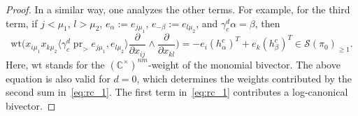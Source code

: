 \documentclass[11pt]{article}
\DeclareMathOperator{\pr}{pr}
\theoremstyle{definition}\newtheorem{definition}[theorem]{Definition}
\theoremstyle{definition}\newtheorem{remark}[theorem]{Remark}
\theoremstyle{remark}
\numberwithin{equation}{section}
\begin{document}
\begin{proof}
    In a similar way, one analyzes the other terms. For example, for the third term, if $j <\mu_1$, $l > \mu_2$, $e_{\alpha}:=e_{j\mu_1}$, $e_{-\beta}:= e_{l\mu_2}$, and $\gamma_c^d\alpha = \beta$, then
    \begin{equation}\label{eq:rc_3}
        \mathrm{wt}\Big(x_{i\mu_1}x_{k\mu_2}\langle \gamma_c^d\pr_>e_{j\mu_1},e_{l\mu_2}\rangle \frac{\partial}{\partial x_{ij}}\wedge \frac{\partial}{\partial x_{kl}}\Big) =  -e_i(h_{\alpha}^c)^T + e_k(h_{\beta}^c)^T \in \mathcal{S}(\pi_0)_{\geq 1}.
    \end{equation}
    Here, $\mathrm{wt}$ stands for the $(\mathbb{C}^{\times})^{nm}$-weight of the monomial bivector. The above equation is also valid for $d=0$, which determines the weights contributed by the second sum in~\eqref{eq:rc_1}. The first term in~\eqref{eq:rc_1} contributes a log-canonical bivector.


\end{proof}
\end{document}
